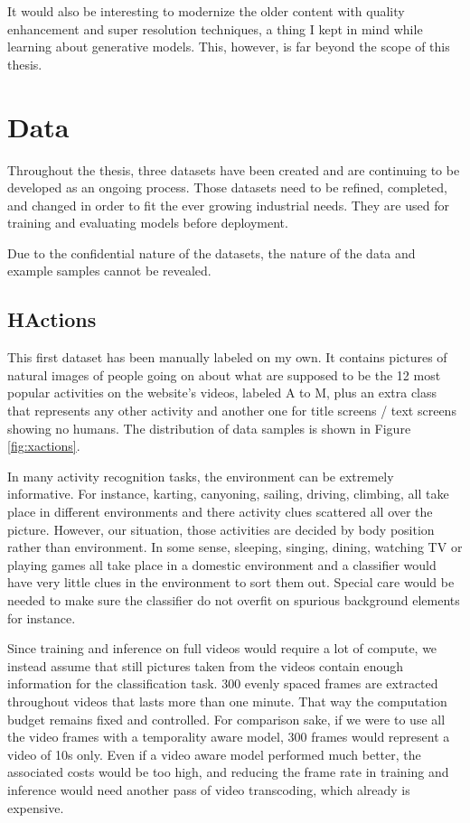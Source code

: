 It would also be interesting to modernize the older content with quality enhancement and super resolution techniques, a thing I kept in mind while learning about generative models. This, however, is far beyond the scope of this thesis.

\section{Data}

Throughout the thesis, three datasets have been created and are continuing to be developed as an ongoing process. Those datasets need to be refined, completed, and changed in order to fit the ever growing industrial needs. They are used for training and evaluating models before deployment.

Due to the confidential nature of the datasets, the nature of the data and example samples cannot be revealed.

\subsection{HActions}
\label{sec:hactions}

This first dataset has been manually labeled on my own. It contains pictures of natural images of people going on about what are supposed to be the 12 most popular activities on the website's videos, labeled A to M, plus an extra class that represents any other activity and another one for title screens / text screens showing no humans. The distribution of data samples is shown in Figure \ref{fig:xactions}.

In many activity recognition tasks, the environment can be extremely informative. For instance, karting, canyoning, sailing, driving, climbing, all take place in different environments and there activity clues scattered all over the picture. However, our situation, those activities are decided by body position rather than environment. In some sense, sleeping, singing, dining, watching TV or playing games all take place in a domestic environment and a classifier would have very little clues in the environment to sort them out. Special care would be needed to make sure the classifier do not overfit on spurious background elements for instance.

Since training and inference on full videos would require a lot of compute, we instead assume that still pictures taken from the videos contain enough information for the classification task. 300 evenly spaced frames are extracted throughout videos that lasts more than one minute. That way the computation budget remains fixed and controlled. For comparison sake, if we were to use all the video frames with a temporality aware model, 300 frames would represent a video of 10s only. Even if a video aware model performed much better, the associated costs would be too high, and reducing the frame rate in training and inference would need another pass of video transcoding, which already is expensive.


